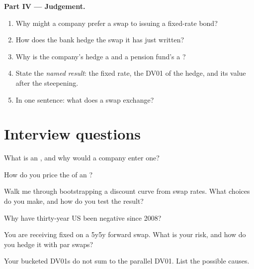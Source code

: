 \begin{problem}
\medskip\noindent\textbf{Part IV --- Judgement.}
\begin{enumerate}[resume]
\item Why might a company prefer a swap to issuing a fixed-rate bond?
\item How does the bank hedge the swap it has just written?
\item Why is the company's hedge a  and a pension fund's a ?
\item State the \emph{named result}: the fixed rate, the DV01 of the hedge, and its
value after the steepening.
\item In one sentence: what does a swap exchange?
\end{enumerate}
\end{problem}

\section{Interview questions}

\begin{interviewq}\label{iq:m2:interest-rate-swaps:1}
What is an , and why would a company enter one?
\end{interviewq}

\begin{interviewq}\label{iq:m2:interest-rate-swaps:2}
How do you price the  of an ?
\end{interviewq}

\begin{interviewq}\label{iq:m2:interest-rate-swaps:3}
Walk me through bootstrapping a discount curve from swap rates. What choices
do you make, and how do you test the result?
\end{interviewq}

\begin{interviewq}\label{iq:m2:interest-rate-swaps:4}
Why have thirty-year US  been negative since 2008?
\end{interviewq}

\begin{interviewq}\label{iq:m2:interest-rate-swaps:5}
You are receiving fixed on a 5y5y forward swap. What is your risk, and how do
you hedge it with par swaps?
\end{interviewq}

\begin{interviewq}\label{iq:m2:interest-rate-swaps:6}
Your bucketed DV01s do not sum to the parallel DV01. List the possible causes.
\end{interviewq}
